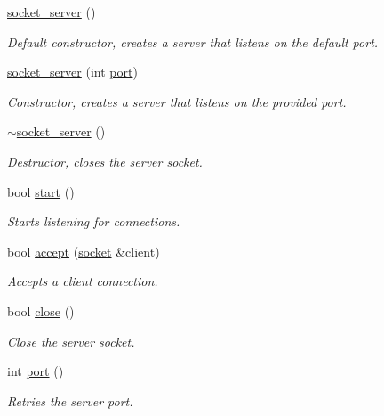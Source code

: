 \begin{DoxyCompactItemize}
\item 
\hyperlink{classcpen333_1_1process_1_1posix_1_1socket__server_a2880c0745a27f52a545619f48f7e06bd}{socket\+\_\+server} ()
\begin{DoxyCompactList}\small\item\em Default constructor, creates a server that listens on the default port. \end{DoxyCompactList}\item 
\hyperlink{classcpen333_1_1process_1_1posix_1_1socket__server_a105715f9f86df458e790db89135a7aac}{socket\+\_\+server} (int \hyperlink{classcpen333_1_1process_1_1posix_1_1socket__server_a5962af3110c19660b29f154f867e87e2}{port})
\begin{DoxyCompactList}\small\item\em Constructor, creates a server that listens on the provided port. \end{DoxyCompactList}\item 
\hyperlink{classcpen333_1_1process_1_1posix_1_1socket__server_a2d07def5c83de193cc2f19c51be31c17}{$\sim$socket\+\_\+server} ()
\begin{DoxyCompactList}\small\item\em Destructor, closes the server socket. \end{DoxyCompactList}\item 
bool \hyperlink{classcpen333_1_1process_1_1posix_1_1socket__server_a0d02be64318ad8d7686633f1bdddc677}{start} ()
\begin{DoxyCompactList}\small\item\em Starts listening for connections. \end{DoxyCompactList}\item 
bool \hyperlink{classcpen333_1_1process_1_1posix_1_1socket__server_ae68768699a5ddc4550263dd758f4e708}{accept} (\hyperlink{classcpen333_1_1process_1_1posix_1_1socket}{socket} \&client)
\begin{DoxyCompactList}\small\item\em Accepts a client connection. \end{DoxyCompactList}\item 
bool \hyperlink{classcpen333_1_1process_1_1posix_1_1socket__server_a306aea15eb1c856f269b1c3727fbfa17}{close} ()
\begin{DoxyCompactList}\small\item\em Close the server socket. \end{DoxyCompactList}\item 
int \hyperlink{classcpen333_1_1process_1_1posix_1_1socket__server_a5962af3110c19660b29f154f867e87e2}{port} ()
\begin{DoxyCompactList}\small\item\em Retries the server port. \end{DoxyCompactList}\end{DoxyCompactItemize}
